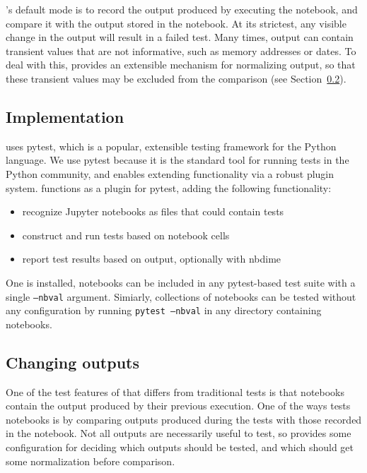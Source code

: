 \documentclass{deliverablereport}
\begin{document}
\nbval's default mode is to record the output produced by executing
the notebook, and compare it with the output stored in the notebook.
At its strictest, any visible change in the output will result in a
failed test.  Many times, output can contain transient values that are
not informative, such as memory addresses or dates.  To deal with
this, \nbval provides an extensible mechanism for normalizing output,
so that these transient values may be excluded from the comparison
(see Section~\ref{sec:changing-outputs}).

\subsection{Implementation}

\nbval uses pytest, which is a popular, extensible testing framework for the Python language.
We use pytest because it is the standard tool for running tests in the Python community,
and enables extending functionality via a robust plugin system.
\nbval functions as a plugin for pytest, adding the following functionality:

\begin{itemize}
\item recognize Jupyter notebooks as files that could contain tests
\item construct and run tests based on notebook cells
\item report test results based on output, optionally with nbdime
\end{itemize}

One \nbval is installed, notebooks can be included in any pytest-based test suite
with a single \texttt{--nbval} argument.
Simiarly, collections of notebooks can be tested without any configuration by running
\texttt{pytest --nbval} in any directory containing notebooks.


\subsection{Changing outputs}\label{sec:changing-outputs}

One of the test features of \nbval that differs from traditional tests
is that notebooks contain the output produced by their previous execution.
One of the ways \nbval tests notebooks is by comparing outputs produced during the tests
with those recorded in the notebook.
Not all outputs are necessarily useful to test,
so \nbval provides some configuration for deciding which outputs should be tested,
and which should get some normalization before comparison.
\end{document}
